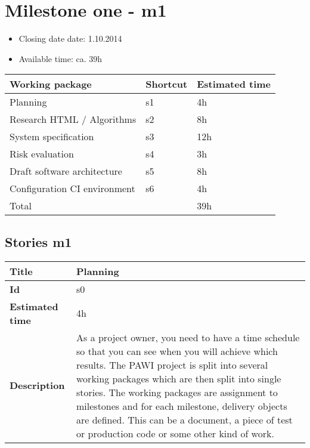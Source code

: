 \section{Milestone one - m1}

\begin{itemize}
\item Closing date date: 1.10.2014
\item Available time: ca. 39h
\end{itemize}

    \begin{tabular}{ | p{10cm} | p{2cm} | p{2cm} |}
    \hline
    \textbf{Working package} & \textbf{Shortcut}& \textbf{Estimated time} \\ \hline
    Planning & s1 &4h \\
    Research HTML / Algorithms & s2 & 8h \\
    System specification & s3 & 12h \\
    Risk evaluation & s4 & 3h\\
    Draft software architecture & s5 & 8h \\ 
    Configuration CI environment & s6 & 4h \\ \hline
    Total & & 39h\\
    \hline
    \end{tabular}

\subsection {Stories m1}

    \begin{tabular}{ | p{4cm} | p{10cm} |}
    \hline
    \textbf{Title} & Planning\\ \hline
    \textbf{Id} & s0\\ \hline
    \textbf{Estimated time} & 4h \\ \hline
    \textbf{Description} &  As a project owner, you need to have a time schedule so that you can see when you will achieve which results. The PAWI project is split into several working packages which are then split into single stories. The working packages are assignment to milestones and for each milestone, delivery objects are defined. This can be a document, a piece of test or production code or some other kind of work.\\
    \hline
    \end{tabular} \\\\

